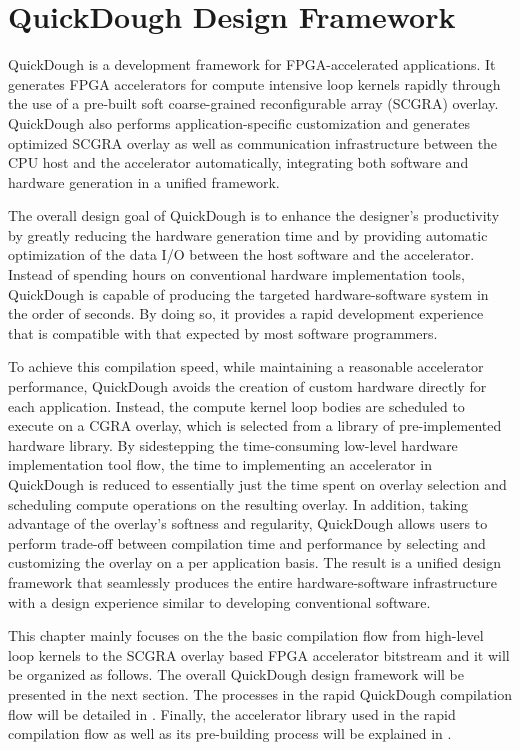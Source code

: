 \chapter{QuickDough Design Framework} \label{chapter:framework}
QuickDough is a development framework for FPGA-accelerated applications. It generates FPGA accelerators for compute intensive loop kernels rapidly through the use of a pre-built soft coarse-grained reconfigurable array (SCGRA) overlay. QuickDough also performs application-specific customization and generates optimized SCGRA overlay as well as communication infrastructure between the CPU host and the accelerator automatically, integrating both software and hardware generation in a unified framework.

The overall design goal of QuickDough is to enhance the designer's productivity by greatly reducing the hardware generation time and by providing automatic optimization of the data I/O between the host software and the accelerator. Instead of spending hours on conventional hardware implementation tools, QuickDough is capable of producing the targeted hardware-software system in the order of seconds. By doing so, it provides a rapid development experience that is compatible with that expected by most software programmers.

To achieve this compilation speed, while maintaining a reasonable accelerator performance, QuickDough avoids the creation of custom hardware directly for each application. Instead, the compute kernel loop bodies are scheduled to execute on a CGRA overlay, which is selected from a library of pre-implemented hardware library. By sidestepping the time-consuming low-level hardware implementation tool flow, the time to implementing an accelerator in QuickDough is reduced to essentially just the time spent on overlay selection and scheduling compute operations on the resulting overlay. In addition, taking advantage of the overlay's softness and regularity, QuickDough allows users to perform trade-off between compilation time and performance by selecting and customizing the overlay on a per application basis. The result is a unified design framework that seamlessly produces the entire hardware-software infrastructure with a design experience similar to developing conventional software.

This chapter mainly focuses on the the basic compilation flow from high-level loop kernels to the SCGRA overlay based FPGA accelerator bitstream and it will be organized as follows. The overall QuickDough design framework will be presented in the next section. The processes in the rapid QuickDough compilation flow will be detailed in . Finally, the accelerator library used in the rapid compilation flow as well as its pre-building process will be explained in .    

